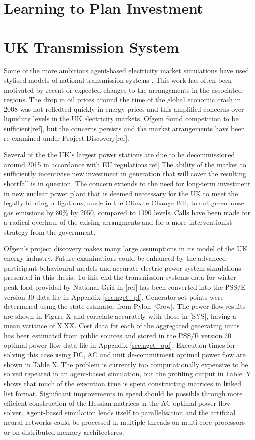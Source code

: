 \section{Learning to Plan Investment}

\section{UK Transmission System}
Some of the more ambitious agent-based electricity market simulations have used
stylised models of national transmission systems
\cite{cincotti:09,weidlich:06}.  This work has often been motivated by recent
or expected changes to the arrangements in the associated regions.  The drop in
oil prices around the time of the global economic crash in 2008 was not
refledted quickly in energy prices and this amplified concerns over liquiduty
levels in the UK electricity markets.  Ofgem found competition to be
sufficient[ref], but the concerns persists and the market arrangements have
been re-examined under Project Discovery[ref].

Several of the the UK's largest power stations are due to be decommissioned
around 2015 in accordance with EU regulations[ref]  The ability of the market
to sufficiently incentivise new investment in generation that will cover the
resulting shortfall is in question.  The concern extends to the need for
long-term investment in new nuclear power plant that is deemed neccessary for
the UK to meet the legally binding obligations, made in the Climate Change
Bill, to cut greenhouse gas emissions by 80\% by 2050, compared to 1990 levels.
Calls have been made for a radical overhaul of the exising arrangments and for
a more interventionist strategy from the government.

Ofgem's project discovery makes many large assumptions in its model of the UK
energy industry.  Future examinations could be enhanced by the advanced
participant behavioural models and accurate electric power system simulations
presented in this thesis.  To this end the transmission systems data
for winter peak load provided by National Grid in [ref] has been converted
into the PSS/E version 30 data file in Appendix \ref{sec:nget_pf}.  Generator
set-points were determined using the state estimator from Pylon [Crow].  The
power flow results are shown in Figure X and correlate accurately with those in
[SYS], having a mean variance of X.XX.  Cost data for each of the aggregated generating units has
been estimated from public sources and stored in the PSS/E version 30 optimal
power flow data file in Appendix \ref{sec:nget_opf}.  Execution times for
solving this case using DC, AC and unit de-commitment optimal power flow are
shown in Table X.  The problem is currently too computationally expensive to be
solved repeated in an agent-based simulation, but the profiling output in
Table~Y shows that much of the execution time is spent constructing matrices in
linked list format.  Significant improvements in speed should be possible
through more efficient construction of the Hessian matrices in the AC optimal
power flow solver.  Agent-based simulation lends itself to parallelisation and
the artificial neural networks could be processed in multiple threads on
multi-core processors or on distributed memory architectures.

